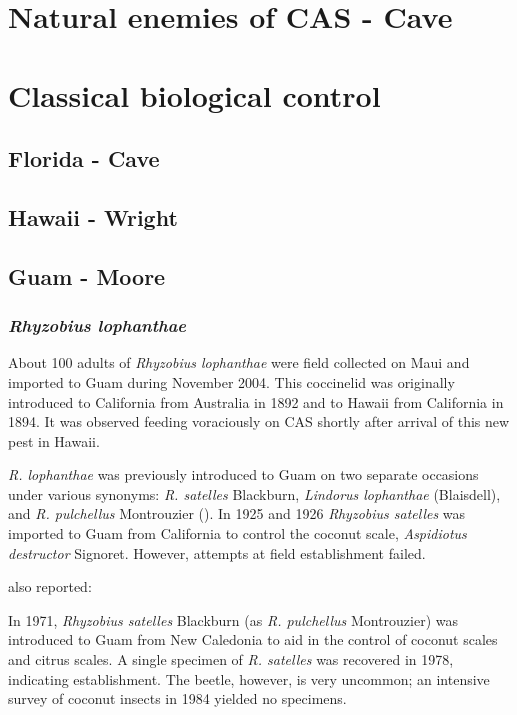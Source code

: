 \documentclass[12pt,letterpaper,english,bibliography=totocnumbered, abstract=on]{scrartcl}
\begin{document}
\section{Natural enemies of CAS - Cave}

\section{Classical biological control}

\subsection{Florida - Cave}

\subsection{Hawaii - Wright}

\subsection{Guam - Moore}

\subsubsection{\textit{Rhyzobius lophanthae}}

About 100 adults of \textit{Rhyzobius lophanthae} were field collected on Maui and imported to Guam during November 2004. This coccinelid was originally 
introduced to California from Australia in 1892 and to Hawaii from California in 1894. It was observed feeding voraciously on CAS shortly after arrival of this new pest in Hawaii. 

\textit{R. lophanthae} was previously introduced to Guam on two separate occasions under various synonyms: \textit{R. satelles} Blackburn, \textit{Lindorus lophanthae} (Blaisdell), and \textit{R. pulchellus} Montrouzier (\cite{nafus_biological_1989}).
In 1925 and 1926 \textit{Rhyzobius satelles} was imported to Guam from California to control the coconut scale, \textit{Aspidiotus destructor} Signoret. However, attempts at field establishment failed.  

\cite{nafus_biological_1989} also reported:
\begin{displayquote}
 In 1971, \textit{Rhyzobius satelles} Blackburn (as \textit{R. pulchellus} Montrouzier) was introduced to Guam from New Caledonia to aid in the control of coconut scales and citrus scales. A single specimen of \textit{R. satelles} was recovered in 1978, indicating establishment. The beetle, however, is very uncommon; an intensive survey of coconut insects in 1984 yielded no specimens.
\end{displayquote}
\end{document}
